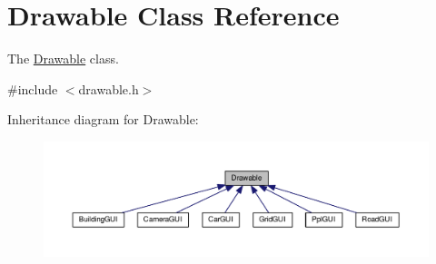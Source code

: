 \hypertarget{classDrawable}{\section{Drawable Class Reference}
\label{classDrawable}
}


The \hyperlink{classDrawable}{Drawable} class.  




{\ttfamily \#include $<$drawable.\-h$>$}



Inheritance diagram for Drawable\-:
\nopagebreak
\begin{figure}[H]
\begin{center}
\leavevmode
\includegraphics[width=350pt]{classDrawable__inherit__graph}
\end{center}
\end{figure}
